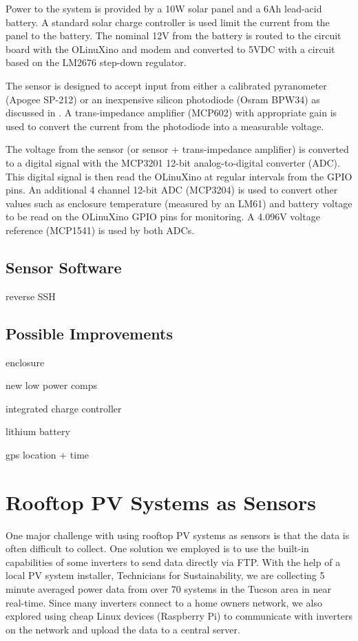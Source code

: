 Power to the system is provided by a 10W solar panel and a 6Ah
lead-acid battery.
A standard solar charge controller is used limit the current from the
panel to the battery.
The nominal 12V from the battery is routed to the circuit board with
the OLinuXino and modem and converted to 5VDC with a circuit based on
the LM2676 step-down regulator.

The sensor is designed to accept input from either a calibrated
pyranometer (Apogee SP-212) or an inexpensive silicon photodiode
(Osram BPW34) as discussed in .
A trans-impedance amplifier (MCP602) with appropriate gain is used to
convert the current from the photodiode into a measurable voltage.

The voltage from the sensor (or sensor + trans-impedance amplifier) is
converted to a digital signal with the MCP3201 12-bit
analog-to-digital converter (ADC).
This digital signal is then read the OLinuXino at regular intervals
from the GPIO pins.
An additional 4 channel 12-bit ADC (MCP3204) is used to convert other
values such as enclosure temperature (measured by an LM61) and battery
voltage to be read on the OLinuXino GPIO pins for monitoring.
A 4.096V voltage reference (MCP1541) is used by both ADCs.

\subsection{Sensor Software}

reverse SSH

\subsection{Possible Improvements}

enclosure

new low power comps

integrated charge controller

lithium battery

gps location + time


\section{Rooftop PV Systems as Sensors}

One major challenge with using rooftop PV systems as sensors is that
the data is often difficult to collect.
One solution we employed is to use the built-in capabilities of some
inverters to send data directly via FTP.
With the help of a local PV system installer, Technicians for
Sustainability, we are collecting 5 minute averaged power data from
over 70 systems in the Tucson area in near real-time.
Since many inverters connect to a home owners network, we also
explored using cheap Linux devices (Raspberry Pi) to communicate with
inverters on the network and upload the data to a central server.


